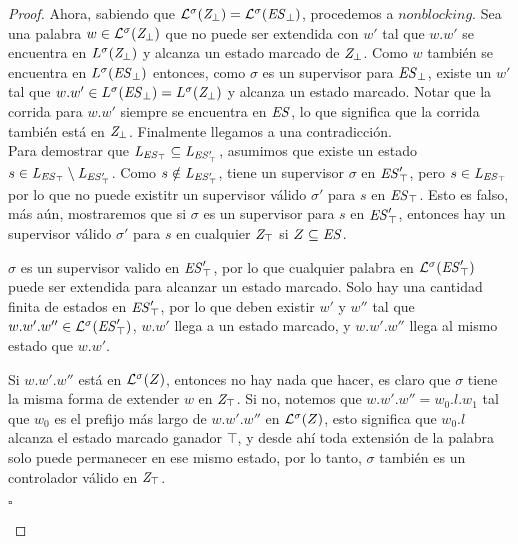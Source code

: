 \begin{proof}
Ahora, sabiendo que $\mathcal{L}^\sigma(\mathit{Z_{\bot}}) = 
\mathcal{L}^\sigma(\mathit{\mathit{ES}_{\bot}})$, procedemos a $nonblocking$. Sea una palabra $w \in 
\mathcal{L}^\sigma(\mathit{Z_{\bot}})$ que no puede ser extendida con $w'$ tal que $w.w'$ se encuentra en $L^\sigma(\mathit{Z_{\bot}})$ y alcanza un estado marcado de $\mathit{Z_{\bot}}$. 
Como $w$ también se encuentra en $L^\sigma(\mathit{\mathit{ES}_{\bot}})$ entonces, como $\sigma$ es un supervisor para $\mathit{\mathit{ES}_{\bot}}$, existe un $w'$ tal que
$w.w' \in L^\sigma(\mathit{\mathit{ES}_{\bot}}) = L^\sigma(\mathit{Z_{\bot}})$ y alcanza un estado marcado. Notar que la corrida para $w.w'$ siempre se encuentra en $\mathit{ES}$, lo que significa que la corrida también está en $\mathit{Z_{\bot}}$. Finalmente llegamos a una contradicción.\\

Para demostrar que $\mathit{L_{\mathit{\mathit{ES}_{\top}}}} \subseteq \mathit{L_{\mathit{\mathit{ES}'_{\top}}}}$, asumimos que existe un estado $s \in \mathit{L_{\mathit{\mathit{ES}_{\top}}}} \setminus \mathit{L_{\mathit{\mathit{ES}'_{\top}}}}$. Como $s \notin \mathit{L_{\mathit{\mathit{ES}'_{\top}}}}$, tiene un supervisor $\sigma$ en $\mathit{\mathit{ES}'_{\top}}$, pero $s \in \mathit{L_{\mathit{\mathit{ES}_{\top}}}}$ por lo que no puede existitr un supervisor válido $\sigma'$ para $s$ en $\mathit{\mathit{ES}_{\top}}$. Esto es falso, más aún, mostraremos que si $\sigma$ es un supervisor para $s$ en $\mathit{\mathit{ES}'_{\top}}$, entonces hay un supervisor válido $\sigma'$ para $s$ en cualquier $\mathit{Z_{\top}}$ si $Z \subseteq \mathit{ES}$.

$\sigma$ es un supervisor valido en $\mathit{\mathit{ES}'_{\top}}$, por lo que cualquier palabra en $\mathcal{L}^\sigma(\mathit{\mathit{ES}'_{\top}})$ puede ser extendida para alcanzar un estado marcado. Solo hay una cantidad finita de estados en  $\mathit{\mathit{ES}'_{\top}}$, por lo que deben existir $w'$ y $w''$ tal que $w.w'.w'' \in \mathcal{L}^\sigma(\mathit{\mathit{ES}'_{\top}})$, $w.w'$ llega a un estado marcado, y $w.w'.w''$ llega al mismo estado que $w.w'$.

Si $w.w'.w''$ está en $\mathcal{L}^\sigma(Z)$, entonces no hay nada que hacer, es claro que $\sigma$ tiene la misma forma de extender $w$ en $\mathit{Z_{\top}}$. Si no, notemos que $w.w'.w'' = w_0.l.w_1$ tal que $w_0$ es el prefijo más largo de $w.w'.w''$ en $\mathcal{L}^\sigma(Z)$, esto significa que $w_0.l$ alcanza el estado marcado ganador $\top$, y desde ahí toda extensión de la palabra solo puede permanecer en ese mismo estado, por lo tanto, $\sigma$ también es un controlador válido en  $\mathit{Z_{\top}}$.
 
\begin{flushright}
$\square$
\end{flushright}

\end{proof}


